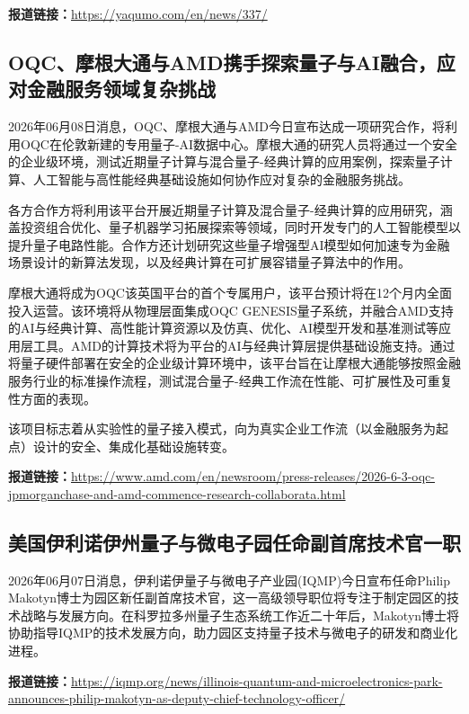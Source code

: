 \documentclass[12pt,a4paper]{ctexart}
\begin{document}
\noindent\textbf{报道链接：}\url{https://yaqumo.com/en/news/337/}

\subsection{ OQC、摩根大通与AMD携手探索量子与AI融合，应对金融服务领域复杂挑战 }

2026年06月08日消息，OQC、摩根大通与AMD今日宣布达成一项研究合作，将利用OQC在伦敦新建的专用量子-AI数据中心。摩根大通的研究人员将通过一个安全的企业级环境，测试近期量子计算与混合量子-经典计算的应用案例，探索量子计算、人工智能与高性能经典基础设施如何协作应对复杂的金融服务挑战。

各方合作方将利用该平台开展近期量子计算及混合量子-经典计算的应用研究，涵盖投资组合优化、量子机器学习拓展探索等领域，同时开发专门的人工智能模型以提升量子电路性能。合作方还计划研究这些量子增强型AI模型如何加速专为金融场景设计的新算法发现，以及经典计算在可扩展容错量子算法中的作用。

摩根大通将成为OQC该英国平台的首个专属用户，该平台预计将在12个月内全面投入运营。该环境将从物理层面集成OQC GENESIS量子系统，并融合AMD支持的AI与经典计算、高性能计算资源以及仿真、优化、AI模型开发和基准测试等应用层工具。AMD的计算技术将为平台的AI与经典计算层提供基础设施支持。通过将量子硬件部署在安全的企业级计算环境中，该平台旨在让摩根大通能够按照金融服务行业的标准操作流程，测试混合量子-经典工作流在性能、可扩展性及可重复性方面的表现。

该项目标志着从实验性的量子接入模式，向为真实企业工作流（以金融服务为起点）设计的安全、集成化基础设施转变。

\noindent\textbf{报道链接：}\url{https://www.amd.com/en/newsroom/press-releases/2026-6-3-oqc-jpmorganchase-and-amd-commence-research-collaborata.html}

\subsection{ 美国伊利诺伊州量子与微电子园任命副首席技术官一职 }

2026年06月07日消息，伊利诺伊量子与微电子产业园(IQMP)今日宣布任命Philip Makotyn博士为园区新任副首席技术官，这一高级领导职位将专注于制定园区的技术战略与发展方向。在科罗拉多州量子生态系统工作近二十年后，Makotyn博士将协助指导IQMP的技术发展方向，助力园区支持量子技术与微电子的研发和商业化进程。

\noindent\textbf{报道链接：}\url{https://iqmp.org/news/illinois-quantum-and-microelectronics-park-announces-philip-makotyn-as-deputy-chief-technology-officer/}
\end{document}
